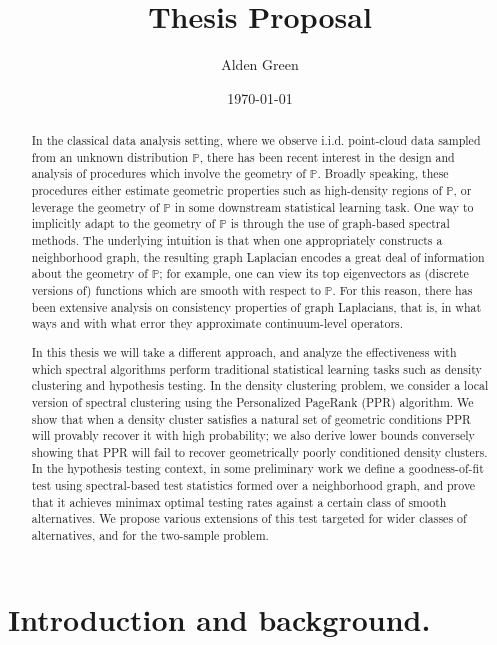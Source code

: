 \documentclass{article}
\newcommand{\1}{\mathbf{1}}
\newcommand{\Pbb}{\mathbb{P}}
\theoremstyle{alden}
\theoremstyle{aldenthm}
\theoremstyle{definition}
\theoremstyle{remark}
\begin{document}
\title{Thesis Proposal}
\author{Alden Green}
\date{\today}
\maketitle

\begin{abstract}
	In the classical data analysis setting, where we observe i.i.d. point-cloud data sampled from an unknown distribution $\Pbb$, there has been recent interest in the design and analysis of procedures which involve the geometry of $\Pbb$. Broadly speaking, these procedures either estimate geometric properties such as high-density regions of $\Pbb$, or leverage the geometry of $\Pbb$ in some downstream statistical learning task. One way to implicitly adapt to the geometry of $\Pbb$ is through the use of graph-based spectral methods. The underlying intuition is that when one appropriately constructs a neighborhood graph, the resulting graph Laplacian encodes a great deal of information about the geometry of $\Pbb$; for example, one can view its top eigenvectors as (discrete versions of) functions which are smooth with respect to $\Pbb$. For this reason, there has been extensive analysis on consistency properties of graph Laplacians, that is, in what ways and with what error they approximate continuum-level operators.
	
	\vspace{.02 in}
	
	In this thesis we will take a different approach, and analyze the effectiveness with which spectral algorithms perform traditional statistical learning tasks such as density clustering and hypothesis testing. In the density clustering problem, we consider a local version of spectral clustering using the Personalized PageRank (PPR) algorithm. We show that when a density cluster satisfies a natural set of geometric conditions PPR will provably recover it with high probability; we also derive lower bounds conversely showing that PPR will fail to recover geometrically poorly conditioned density clusters. In the hypothesis testing context, in some preliminary work we define a goodness-of-fit test using spectral-based test statistics formed over a neighborhood graph, and prove that it achieves minimax optimal testing rates against a certain class of smooth alternatives. We propose various extensions of this test targeted for wider classes of alternatives, and for the two-sample problem.
\end{abstract}


\section{Introduction and background.}
\end{document}
